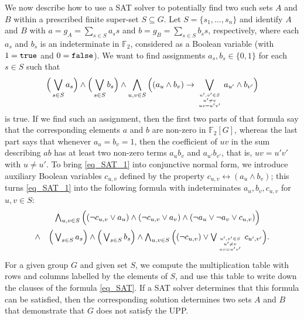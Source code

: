 \documentclass[11pt]{amsart}
\theoremstyle{mythm}
\theoremstyle{mydef}
\theoremstyle{myrem}
\numberwithin{equation}{section}
\begin{document}
We now describe how to use a SAT solver to potentially find two such sets $A$ and $B$ within a prescribed finite super-set $S\subseteq G$. Let $S=\{s_1,\ldots,s_n\}$ and identify $A$ and $B$ with $a=g_A=\sum_{s\in S} a_s s$ and $b=g_B=\sum_{s\in S}b_s s$, respectively, where each $a_s$ and $b_s$ is an indeterminate in $\mathbb{F}_2$, considered as a Boolean variable (with $1={\tt true}$ and $0={\tt false}$). We want to find assignments $a_s,b_s\in\{0,1\}$ for each $s\in S$ such that
\begin{align}\label{eq_SAT_1}\Big(\bigvee_{s\in S} a_s\Big)\wedge \Big(\bigvee_{s\in S} b_s\Big)\wedge\bigwedge_{u,v\in S} \Big( (a_u\wedge b_v) \rightarrow \bigvee_{u',v'\in S\atop {u'\ne v \atop uv=u'v'}} a_{u'}\wedge b_{v'}\Big)
\end{align} 
is true. If we find such an assignment, then the first two parts of that formula say that the  corresponding elements $a$ and $b$ are non-zero in $\mathbb{F}_2[G]$, whereas the last part says that whenever $a_u=b_v=1$, then the coefficient of $uv$ in the sum describing $ab$ has at least two non-zero terms $a_ub_v$ and $a_{u'}b_{v'}$, that is, $uv=u'v'$ with $u\ne u'$. To bring \eqref{eq_SAT_1}  into conjunctive normal form, we introduce auxiliary Boolean variables $c_{u,v}$ defined by the property $c_{u,v} \leftrightarrow (a_u\wedge b_v)$; this turns \eqref{eq_SAT_1} into the following formula with indeterminates $a_u, b_v, c_{u,v}$ for $u,v\in S$:
\begin{equation}\label{eq_SAT}
	\begin{array}{ll}&\hspace*{1.8ex}\bigwedge_{u,v\in S} \Big((\neg c_{u,v}\vee a_u) \wedge (\neg c_{u,v} \vee a_v)\wedge (\neg a_u\vee \neg  a_v\vee c_{u,v})\Big)\\[2ex]\wedge&\Big(\bigvee_{s\in S} a_s\Big)\wedge \Big(\bigvee_{s\in S} b_s\Big)\wedge \bigwedge_{u,v\in S} \Big( (\neg c_{u,v}) \vee  \bigvee_{u',v'\in S\atop {u'\ne v\atop uv=u'v'}} c_{u',v'}\Big).
	\end{array}
\end{equation}

For a given group $G$ and given set $S$, we compute the multiplication table with rows and columns labelled by the elements of $S$, and use this table to write down the clauses of the formula \eqref{eq_SAT}. If a SAT solver determines that this formula can be satisfied, then the corresponding solution determines two sets $A$ and $B$ that demonstrate that $G$ does not satisfy the UPP.
\end{document}
